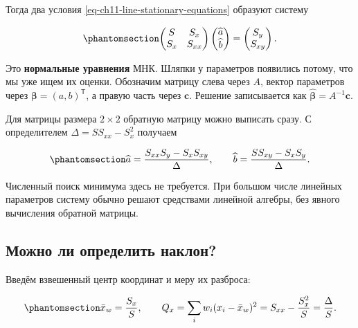 \documentclass[
  russian,
  11pt,
  a4paper,
  open=any]{scrbook}
\begin{document}
Тогда два условия \ref{eq-ch11-line-stationary-equations} образуют
систему

\begin{equation}\protect\phantomsection\label{eq-ch11-normal-equations}{
\begin{pmatrix}S&S_x\\S_x&S_{xx}\end{pmatrix}
\begin{pmatrix}\widehat a\\\widehat b\end{pmatrix}
=\begin{pmatrix}S_y\\S_{xy}\end{pmatrix}.
}\end{equation}

Это \textbf{нормальные уравнения} МНК. Шляпки у параметров появились
потому, что мы уже ищем их оценки. Обозначим матрицу слева через \(A\),
вектор параметров через \(\boldsymbol\beta=(a,b)^{\mathsf T}\), а правую
часть через \(\mathbf c\). Решение записывается как
\(\widehat{\boldsymbol\beta}=A^{-1}\mathbf c\).

Для матрицы размера \(2\times2\) обратную матрицу можно выписать сразу.
С определителем \(\Delta=SS_{xx}-S_x^2\) получаем

\begin{equation}\protect\phantomsection\label{eq-ch11-line-estimates}{
\widehat a=\frac{S_{xx}S_y-S_xS_{xy}}{\Delta},
\qquad
\widehat b=\frac{SS_{xy}-S_xS_y}{\Delta}.
}\end{equation}

Численный поиск минимума здесь не требуется. При большом числе линейных
параметров систему обычно решают средствами линейной алгебры, без явного
вычисления обратной матрицы.

\subsection{Можно ли определить
наклон?}\label{ux43cux43eux436ux43dux43e-ux43bux438-ux43eux43fux440ux435ux434ux435ux43bux438ux442ux44c-ux43dux430ux43aux43bux43eux43d}

Введём взвешенный центр координат и меру их разброса:

\begin{equation}\protect\phantomsection\label{eq-ch11-weighted-coordinate-spread}{
\bar x_w=\frac{S_x}{S},
\qquad
Q_x=\sum_iw_i(x_i-\bar x_w)^2
=S_{xx}-\frac{S_x^2}{S}
=\frac{\Delta}{S}.
}\end{equation}
\end{document}
